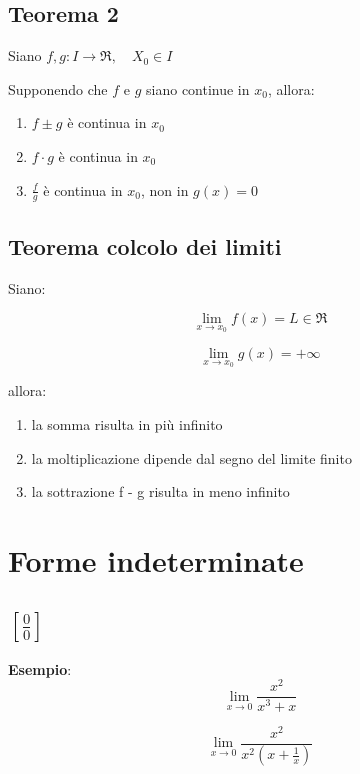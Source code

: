 \documentclass{article}
\begin{document}
\subsection{Teorema 2}
Siano $f,g : I \rightarrow \Re, \quad X_0 \in I$

Supponendo che $f$ e $g$ siano continue in $x_0$, allora:
\begin{enumerate}
    \item $f \pm g$ è continua in $x_0$
    \item $f \cdot g$ è continua in $x_0$
    \item $\frac{f}{g}$ è continua in $x_0$, non in $g(x) =0$
\end{enumerate}

\subsection{Teorema colcolo dei limiti}

Siano:

\begin{equation*}
    \lim_{x \rightarrow x_0} f(x) = L \in \Re
\end{equation*}

\begin{equation*}
    \lim_{x \rightarrow x_0} g(x) = +\infty
\end{equation*}

allora:

\begin{enumerate}
    \item la somma risulta in più infinito
    \item la moltiplicazione dipende dal segno del limite finito
    \item la sottrazione f - g risulta in meno infinito 
\end{enumerate}

\section{Forme indeterminate}
\subsection{$[\frac{0}{0}]$}
\textbf{Esempio}:
\begin{equation*}
    \lim_{x \rightarrow 0} \frac{x^2}{x^3 + x}
\end{equation*} 

\begin{equation*}
    \lim_{x \rightarrow 0} \frac{x^2}{x^2(x + \frac{1}{x})}
\end{equation*}
\end{document}

